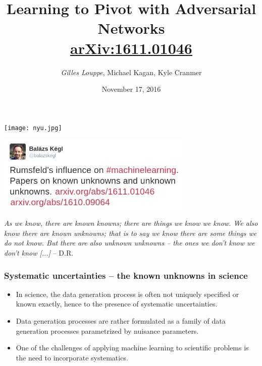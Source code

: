 \documentclass{beamer}
\title{{\bf Learning to Pivot with Adversarial Networks}\\
\href{https://arxiv.org/abs/1611.01046}{arXiv:1611.01046}}
\author{{\it Gilles Louppe}, Michael Kagan, Kyle Cranmer}
\date{November 17, 2016}
\begin{document}
\begin{frame}[plain]
\titlepage
\centering
\texttt{[image: nyu.jpg]}
\end{frame}



\begin{frame}

    \begin{center}
            \includegraphics[width=0.7\textwidth]{figures/kegl.jpg}
    \end{center}

    \begin{center}
        {\it As we know, there are known knowns; there are things we know we know.
             We also know there are known unknowns; that is to say we know there
             are some things we do not know. But there are also unknown unknowns
             – the ones we don't know we don't know [...]} -- D.R.
    \end{center}
\end{frame}


\begin{frame}
    \frametitle{Systematic uncertainties -- the known unknowns in science}

    \begin{itemize}
        \item In science, the data
        generation process is often {\color{red} not uniquely specified} or known exactly, hence to the presence
        of systematic uncertainties.

        \item Data generation processes are rather formulated as a family of data generation processes
        parametrized by {\color{blue}nuisance parameters}.

        \item One of the challenges of applying machine learning to scientific
        problems is the {\color{red} need to incorporate systematics}.
    \end{itemize}

\end{frame}
\end{document}
